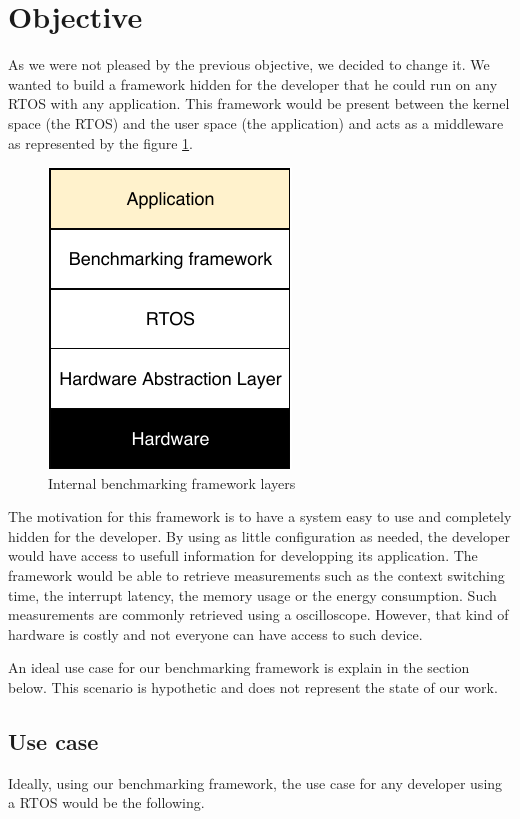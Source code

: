 \section{Objective}

As we were not pleased by the previous objective, we decided to change it.
We wanted to build a framework hidden for the developer that he could run on any RTOS with any application. This framework would be present between the kernel space (the RTOS) and the user space (the application) and acts as a middleware as represented by the figure \ref{fig:bench-framework-layers}.

\begin{figure}[!ht]
  \centering
  \includegraphics[scale=1]{assets/bench-framework-layers.pdf}
  \caption{\label{fig:bench-framework-layers}Internal benchmarking framework layers}
\end{figure}

The motivation for this framework is to have a system easy to use and completely hidden for the developer.
By using as little configuration as needed, the developer would have access to usefull information for developping its application.
The framework would be able to retrieve measurements such as the context switching time, the interrupt latency, the memory usage or the energy consumption.
Such measurements are commonly retrieved using a oscilloscope.
However, that kind of hardware is costly and not everyone can have access to such device.

An ideal use case for our benchmarking framework is explain in the section below.
This scenario is hypothetic and does not represent the state of our work.

\subsection{Use case}
Ideally, using our benchmarking framework, the use case for any developer using a RTOS would be the following.

